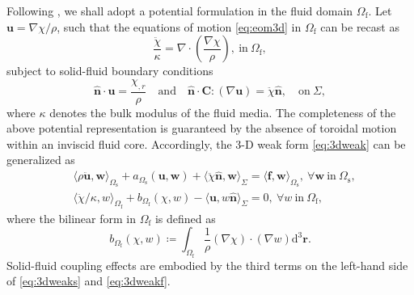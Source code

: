\documentclass[extra]{gji}
\begin{document}
Following \cite{chaljub2004spectral, 
nissen2007axisem}, we shall adopt a potential formulation in the fluid 
domain $\Omega_{\text{f}}$. Let $\mathbf{u} = \nabla\chi/\rho$,
such that the equations of motion \eqref{eq:eom3d} in $\Omega_{\text{f}}$
can be recast as
\begin{equation}
  \frac{\ddot{\chi}}{\kappa} = \nabla\cdot\left(
  \frac{\nabla\chi}{\rho}\right), \ \text{in} \ \Omega_{\text{f}},
\end{equation}
subject to solid-fluid boundary conditions
\begin{equation}
  \hat{\mathbf{n}}\cdot\mathbf{u}=\frac{\chi_{,r}}{\rho}
  \quad \text{and} \quad 
  \hat{\mathbf{n}}\cdot\mathbf{C}:\left(\nabla\mathbf{u}\right)= 
  \ddot{\chi}\hat{\mathbf{n}}, \quad \text{on} \ \Sigma,
\end{equation}
where $\kappa$ denotes the bulk modulus of the fluid media. 
The completeness of the above potential representation is 
guaranteed by the absence of toroidal motion within an inviscid fluid core.
Accordingly, the 3-D weak form \eqref{eq:3dweak} can be generalized as
\begin{align}
&  \langle \rho\ddot{\mathbf{u}},\mathbf{w}\rangle_{\Omega_\text{s}}\!+\!
  a_{\Omega_\text{s}}\left(\mathbf{u},\mathbf{w}\right)\!+\!
  \langle \ddot{\chi}\hat{\mathbf{n}},\mathbf{w}\rangle_{\Sigma}
  \!=\!\langle \mathbf{f},\mathbf{w}\rangle_{\Omega_\text{s}}
  ,\ \forall\mathbf{w}\ \text{in}\ \Omega_\text{s},
  \label{eq:3dweaks}\\[.5em]
&  \langle \ddot{\chi}/\kappa,w \rangle_{\Omega_\text{f}}\!+\!
  b_{\Omega_\text{f}}\left(\chi,w\right)\!-\!
  \langle \mathbf{u}, w\hat{\mathbf{n}}\rangle_{\Sigma}
  \!=\!0,\ \forall w\ \text{in}\ \Omega_\text{f},
  \label{eq:3dweakf}
\end{align}
where the bilinear form in $\Omega_\text{f}$ is defined as
\begin{equation}
  b_{\Omega_\text{f}}\left(\chi,w\right) \coloneqq
  \int_{\Omega_\text{f}} \frac{1}{\rho}
  \left(\nabla\chi\right) \cdot \left(\nabla w\right) \text{d}^{3}\mathbf{r}.
\end{equation}
Solid-fluid coupling effects are embodied by the third terms
on the left-hand side of \eqref{eq:3dweaks} and \eqref{eq:3dweakf}.
\end{document}
